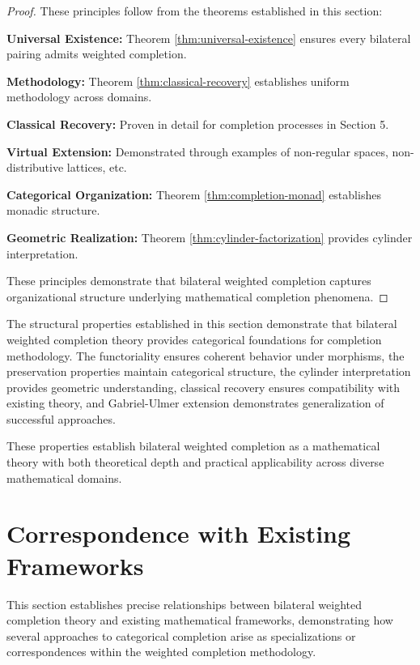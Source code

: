 \documentclass[11pt]{article}
\theoremstyle{plain}
\theoremstyle{definition}
\theoremstyle{remark}
\begin{document}
\begin{proof}
These principles follow from the theorems established in this section:

\textbf{Universal Existence:} Theorem \ref{thm:universal-existence} ensures every bilateral pairing admits weighted completion.

\textbf{Methodology:} Theorem \ref{thm:classical-recovery} establishes uniform methodology across domains.

\textbf{Classical Recovery:} Proven in detail for completion processes in Section 5.

\textbf{Virtual Extension:} Demonstrated through examples of non-regular spaces, non-distributive lattices, etc.

\textbf{Categorical Organization:} Theorem \ref{thm:completion-monad} establishes monadic structure.

\textbf{Geometric Realization:} Theorem \ref{thm:cylinder-factorization} provides cylinder interpretation.

These principles demonstrate that bilateral weighted completion captures organizational structure underlying mathematical completion phenomena.
\end{proof}

The structural properties established in this section demonstrate that bilateral weighted completion theory provides categorical foundations for completion methodology. The functoriality ensures coherent behavior under morphisms, the preservation properties maintain categorical structure, the cylinder interpretation provides geometric understanding, classical recovery ensures compatibility with existing theory, and Gabriel-Ulmer extension demonstrates generalization of successful approaches.

These properties establish bilateral weighted completion as a mathematical theory with both theoretical depth and practical applicability across diverse mathematical domains.

\section{Correspondence with Existing Frameworks}

This section establishes precise relationships between bilateral weighted completion theory and existing mathematical frameworks, demonstrating how several approaches to categorical completion arise as specializations or correspondences within the weighted completion methodology.
\end{document}
